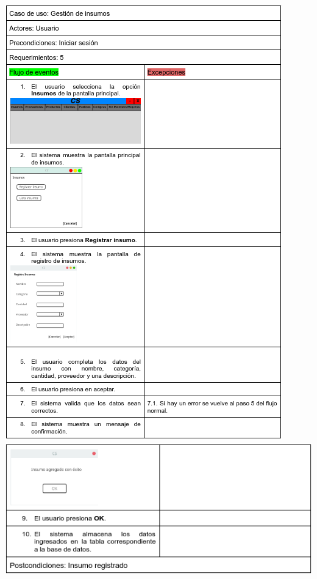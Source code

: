 \documentclass{article}
\begin{document}
	\includegraphics[width=1\linewidth]{imagenes/especificacion_insumos.png}
	\includegraphics[width=1\linewidth]{imagenes/especificacion_insumos2.png}
\end{document}

